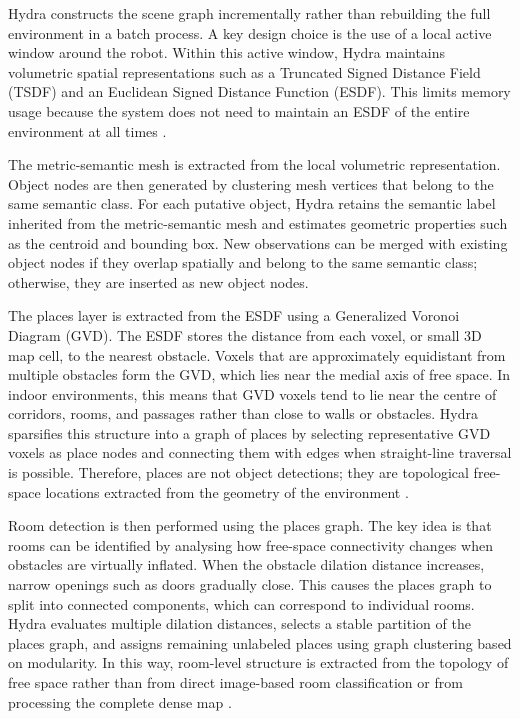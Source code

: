 {\small

Hydra constructs the scene graph incrementally rather than rebuilding the full environment in a batch process. A key design choice is the use of a local active window around the robot. Within this active window, Hydra maintains volumetric spatial representations such as a Truncated Signed Distance Field (TSDF) and an Euclidean Signed Distance Function (ESDF). This limits memory usage because the system does not need to maintain an ESDF of the entire environment at all times \cite{hughes2022hydra}.

The metric-semantic mesh is extracted from the local volumetric representation. Object nodes are then generated by clustering mesh vertices that belong to the same semantic class. For each putative object, Hydra retains the semantic label inherited from the metric-semantic mesh and estimates geometric properties such as the centroid and bounding box. New observations can be merged with existing object nodes if they overlap spatially and belong to the same semantic class; otherwise, they are inserted as new object nodes.

The places layer is extracted from the ESDF using a Generalized Voronoi Diagram (GVD). The ESDF stores the distance from each voxel, or small 3D map cell, to the nearest obstacle. Voxels that are approximately equidistant from multiple obstacles form the GVD, which lies near the medial axis of free space. In indoor environments, this means that GVD voxels tend to lie near the centre of corridors, rooms, and passages rather than close to walls or obstacles. Hydra sparsifies this structure into a graph of places by selecting representative GVD voxels as place nodes and connecting them with edges when straight-line traversal is possible. Therefore, places are not object detections; they are topological free-space locations extracted from the geometry of the environment \cite{hughes2022hydra}.

Room detection is then performed using the places graph. The key idea is that rooms can be identified by analysing how free-space connectivity changes when obstacles are virtually inflated. When the obstacle dilation distance increases, narrow openings such as doors gradually close. This causes the places graph to split into connected components, which can correspond to individual rooms. Hydra evaluates multiple dilation distances, selects a stable partition of the places graph, and assigns remaining unlabeled places using graph clustering based on modularity. In this way, room-level structure is extracted from the topology of free space rather than from direct image-based room classification or from processing the complete dense map \cite{hughes2022hydra}.

}


